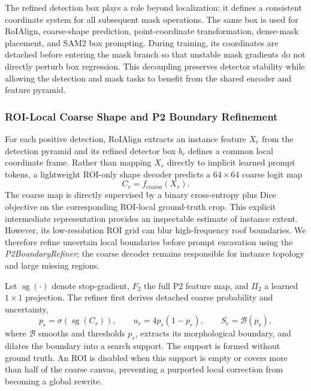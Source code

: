 \documentclass[letterpaper,journal]{IEEEtran}
\begin{document}
The refined detection box plays a role beyond localization: it defines a consistent coordinate system for all subsequent mask operations. The same box is used for RoIAlign, coarse-shape prediction, point-coordinate transformation, dense-mask placement, and SAM2 box prompting. During training, its coordinates are detached before entering the mask branch so that unstable mask gradients do not directly perturb box regression. This decoupling preserves detector stability while allowing the detection and mask tasks to benefit from the shared encoder and feature pyramid.

\subsubsection{ROI-Local Coarse Shape and P2 Boundary Refinement}
For each positive detection, RoIAlign extracts an instance feature $X_r$ from the detection pyramid and its refined detector box $b_r$ defines a common local coordinate frame. Rather than mapping $X_r$ directly to implicit learned prompt tokens, a lightweight ROI-only shape decoder predicts a $64\times64$ coarse logit map
\begin{equation}
C_r=f_{\mathrm{coarse}}(X_r).
\label{eq:coarse_logits}
\end{equation}
The coarse map is directly supervised by a binary cross-entropy plus Dice objective on the corresponding ROI-local ground-truth crop. This explicit intermediate representation provides an inspectable estimate of instance extent. However, its low-resolution ROI grid can blur high-frequency roof boundaries. We therefore refine uncertain local boundaries before prompt excavation using the \emph{P2BoundaryRefiner}; the coarse decoder remains responsible for instance topology and large missing regions.

Let $\operatorname{sg}(\cdot)$ denote stop-gradient, $F_2$ the full P2 feature map, and $\Pi_2$ a learned $1\times1$ projection. The refiner first derives detached coarse probability and uncertainty,
\begin{equation}
p_r=\sigma(\operatorname{sg}(C_r)), \qquad
u_r=4p_r(1-p_r), \qquad
S_r=\mathcal{B}(p_r),
\label{eq:p2_support}
\end{equation}
where $\mathcal{B}$ smooths and thresholds $p_r$, extracts its morphological boundary, and dilates the boundary into a search support. The support is formed without ground truth. An ROI is disabled when this support is empty or covers more than half of the coarse canvas, preventing a purported local correction from becoming a global rewrite.
\end{document}
